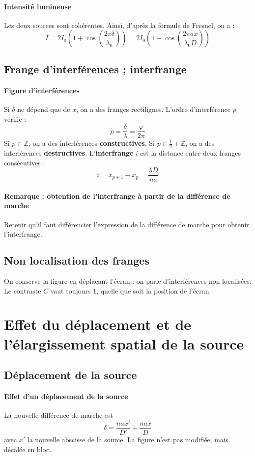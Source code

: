 \documentclass[french]{book}
\theoremstyle{plain}
\theoremstyle{definition}
\theoremstyle{remark}
\newcommand{\Z}{\mathbb{Z}}
\begin{document}
\paragraph{Intensité lumineuse} Les deux sources sont cohérentes. Ainsi, d'après la formule de Fresnel, on a : $$I=2I_0\left(1+\cos\left(\frac{2\pi\delta}{\lambda_0}\right)\right)=2I_0\left(1+\cos\left(\frac{2\pi ax}{\lambda_0D}\right)\right)$$
\subsection{Frange d'interférences ; interfrange}
\paragraph{Figure d'interférences} Si $\delta$ ne dépend que de $x$, on a des franges rectilignes. L'ordre d'interférence $p$ vérifie : $$p=\frac{\delta}{\lambda}=\frac{\varphi}{2\pi}$$ Si $p\in\Z$, on a des interférences \textbf{constructives}. Si $p\in\frac{1}{2}+\Z$, on a des interférences \textbf{destructives}. L'\textbf{interfrange} $i$ est la distance entre deux franges consécutives : $$i=x_{p+1}-x_p=\frac{\lambda D}{na}$$
\paragraph{Remarque : obtention de l'interfrange à partir de la différence de marche} Retenir qu'il faut différencier l'expression de la différence de marche pour obtenir l'interfrange.
\subsection{Non localisation des franges}
On conserve la figure en déplaçant l'écran : on parle d'interférences non localisées. Le contraste $C$ vaut toujours $1$, quelle que soit la position de l'écran.
\section{Effet du déplacement et de l'élargissement spatial de la source}
\subsection{Déplacement de la source}
\paragraph{Effet d’un déplacement de la source} La nouvelle différence de marche est $$\delta=\frac{nax'}{D'}+\frac{nax}{D}$$ avec $x'$ la nouvelle abscisse de la source. La figure n’est pas modifiée, mais décalée en bloc.
\end{document}
